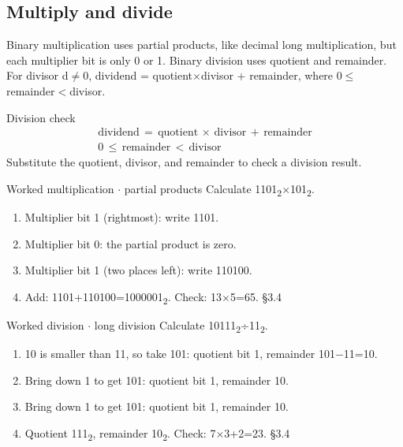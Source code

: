 \documentclass[11pt]{article}
\begin{document}
\begin{keepsection}
\begin{keepsection}
\subsection{Multiply and divide}

Binary multiplication uses partial products, like decimal long multiplication, but each multiplier bit is only 0 or 1. Binary division uses quotient and remainder. For divisor d\ensuremath{\neq}0, dividend = quotient\ensuremath{\times}divisor + remainder, where 0\ensuremath{\leq}remainder\ensuremath{<}divisor.

\begin{equationcard}{Division check}
\[ \begin{gathered} \text{dividend}\, =\, \text{quotient}\, \times \, \text{divisor}\, +\, \text{remainder} \\ 0\, \leq \, \text{remainder}\, <\, \text{divisor} \end{gathered} \]
{\small Substitute the quotient, divisor, and remainder to check a division result.}
\end{equationcard}

\begin{workedbox}{Worked multiplication \ensuremath{\cdot} partial products}
Calculate 1101\textsubscript{2}\ensuremath{\times}101\textsubscript{2}.

\begin{enumerate}
\item Multiplier bit 1 (rightmost): write 1101.
\item Multiplier bit 0: the partial product is zero.
\item Multiplier bit 1 (two places left): write 110100.
\item Add: 1101+110100=1000001\textsubscript{2}. Check: 13\ensuremath{\times}5=65. \hfill{\small\color{FAUblue}§3.4}
\end{enumerate}
\end{workedbox}

\begin{workedbox}{Worked division \ensuremath{\cdot} long division}
Calculate 10111\textsubscript{2}÷11\textsubscript{2}.

\begin{enumerate}
\item 10 is smaller than 11, so take 101: quotient bit 1, remainder 101\ensuremath{-}11=10.
\item Bring down 1 to get 101: quotient bit 1, remainder 10.
\item Bring down 1 to get 101: quotient bit 1, remainder 10.
\item Quotient 111\textsubscript{2}, remainder 10\textsubscript{2}. Check: 7\ensuremath{\times}3+2=23. \hfill{\small\color{FAUblue}§3.4}
\end{enumerate}
\end{workedbox}


\end{keepsection}
\end{keepsection}
\end{document}

